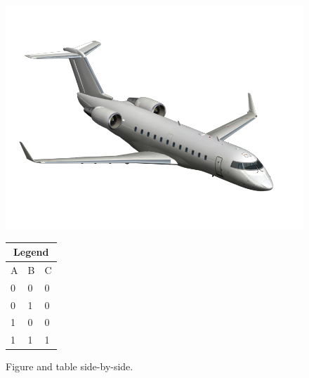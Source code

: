 \begin{figure}[!htb]
  \begin{minipage}[b]{0.60\linewidth}
    \centering
    \includegraphics[width=\linewidth]{Figures/Bombardier_CRJ200}
  \end{minipage}%
  \begin{minipage}[b]{0.30\linewidth}
    \centering
    \begin{tabular}[b]{lll}
      \toprule
        \multicolumn{3}{c}{Legend} \\
      \midrule
        A & B & C \\
        0 & 0 & 0 \\
        0 & 1 & 0 \\
        1 & 0 & 0 \\
        1 & 1 & 1 \\
      \bottomrule
    \end{tabular}
    \vspace{5em}
  \end{minipage}
\caption{Figure and table side-by-side.}
\label{fig:side_by_side}
\end{figure}

